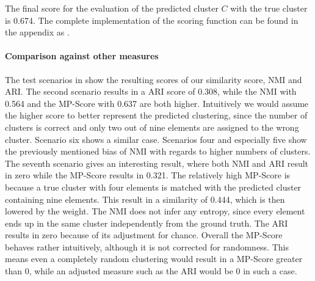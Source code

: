 The final score for the evaluation of the predicted cluster $C$ with the true cluster is 0.674.
The complete implementation of the scoring function can be found in the appendix as .

\paragraph{Comparison against other measures}
The test scenarios in  show the resulting scores of our similarity score, NMI and ARI.
The second scenario results in a ARI score of 0.308,
while the NMI with 0.564 and the MP-Score with 0.637 are both higher.
Intuitively we would assume the higher score to better represent the predicted clustering,
since the number of clusters is correct and only two out of nine elements are assigned to the wrong cluster.
Scenario six shows a similar case.
Scenarios four and especially five show the previously mentioned bias of NMI with regards to higher numbers of clusters.
The seventh scenario gives an interesting result,
where both NMI and ARI result in zero while the MP-Score results in 0.321.
The relatively high MP-Score is because a true cluster with four elements is matched
with the predicted cluster containing nine elements.
This result in a similarity of 0.444, which is then lowered by the weight.
The NMI does not infer any entropy, since every element ends up in the same cluster independently from the ground truth.
The ARI results in zero because of its adjustment for chance.
Overall the MP-Score behaves rather intuitively, although it is not corrected for randomness.
This means even a completely random clustering would result in a MP-Score greater than 0,
while an adjusted measure such as the ARI would be 0 in such a case.

